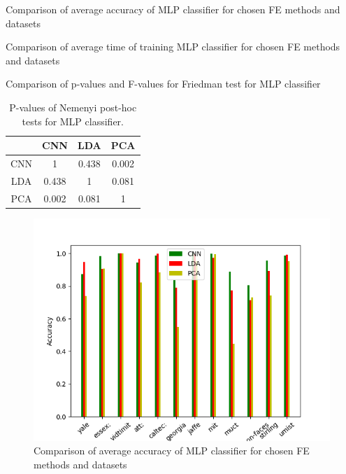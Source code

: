 \documentclass[a4paper, 10 pt, journal]{ieeeconf}
\begin{document}
\begin{table}[!h]
    \centering
    \caption{Comparison of average accuracy of MLP classifier for chosen FE methods and datasets}
    
    \label{table:NN_acc_comparison}
\end{table}

\begin{table}[!h]
    \centering
    \caption{Comparison of average time of training MLP classifier for chosen FE methods and datasets}
    
    \label{table:NN_fit_time_comparison}
\end{table}

\begin{table}[!h]
    \centering
    \caption{Comparison of p-values and F-values for Friedman test for MLP classifier}
    
    \label{table:NN_pvalues}
\end{table}

\begin{table}[!h]
    \centering
    \caption{P-values of Nemenyi post-hoc tests for MLP classifier.}
    \begin{tabular}{|c|c|c|c|}
         \hline
          & CNN & LDA & PCA \\
         \hline
         CNN &  1 &  0.438 &  0.002 \\
         \hline
         LDA &  0.438 & 1 &  0.081 \\
         \hline
         PCA &  0.002 & 0.081 & 1 \\
         \hline
    \end{tabular}
    \label{tab:NN_posthoc_pvalues}
\end{table}

\begin{figure}[!h]
    \centering
    \includegraphics[scale=0.875]{images/NN_accuracy_comparison.png}
    \caption{Comparison of average accuracy of MLP classifier for chosen FE methods and datasets}
    \label{fig:NN_acc_comparision}
\end{figure}
\end{document}

